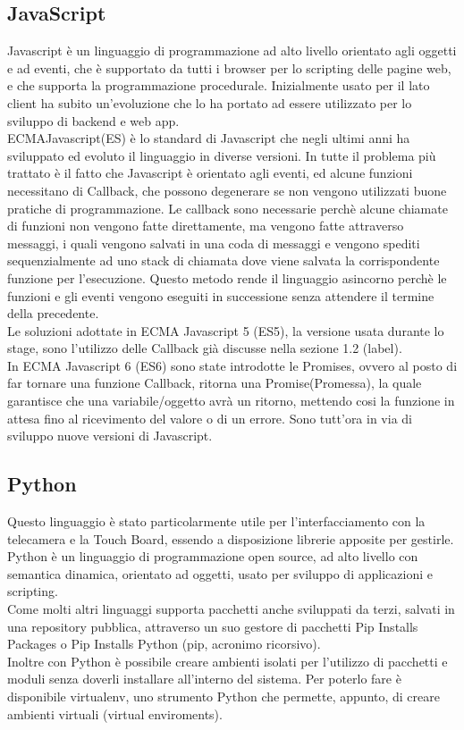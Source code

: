 \subsection{JavaScript}
Javascript \`e un linguaggio di programmazione ad alto livello orientato agli oggetti e ad eventi, che \`e supportato da tutti i browser
per lo scripting delle pagine web, e che supporta la programmazione procedurale.
Inizialmente usato per il lato client ha subito un'evoluzione che lo ha portato ad essere utilizzato per lo sviluppo di backend e web app.
\\[2\baselineskip]
ECMAJavascript(ES) \`e lo standard di Javascript che negli ultimi anni ha sviluppato ed evoluto il linguaggio in diverse versioni.
In tutte il problema pi\`u trattato \`e il fatto che Javascript \`e orientato agli eventi,
ed alcune funzioni necessitano di Callback, che possono degenerare se non vengono
utilizzati buone pratiche di programmazione. Le callback sono necessarie perch\`e alcune chiamate di funzioni non vengono fatte direttamente, ma vengono
fatte attraverso messaggi, i quali vengono salvati in una coda di messaggi e vengono spediti sequenzialmente ad uno stack di chiamata dove
viene salvata la corrispondente funzione per l'esecuzione. Questo metodo rende il linguaggio asincorno perch\`e le funzioni e gli eventi
vengono eseguiti in successione senza attendere il termine della precedente.
\\[1\baselineskip]Le soluzioni adottate in ECMA Javascript 5 (ES5), la versione usata durante lo
stage, sono l'utilizzo delle Callback già discusse nella sezione 1.2 (label).
\\[1\baselineskip]
In ECMA Javascript 6 (ES6) sono state introdotte le Promises, ovvero al posto di far tornare una funzione Callback, ritorna una Promise(Promessa),
la quale garantisce che una variabile/oggetto avr\`a un ritorno, mettendo cosi la funzione in attesa fino al ricevimento del valore o di un errore.
Sono tutt'ora in via di sviluppo nuove versioni di Javascript.

\subsection{Python}\label{cap:python}
Questo linguaggio \`e stato particolarmente utile per l'interfacciamento con la telecamera e la Touch Board, essendo a disposizione librerie
apposite per gestirle.
Python \`e un linguaggio di programmazione open source, ad alto livello con semantica dinamica, orientato ad oggetti, usato
per sviluppo di applicazioni e scripting.\\[1\baselineskip]
Come molti altri linguaggi supporta pacchetti anche sviluppati da terzi, salvati in una repository pubblica,
attraverso un suo gestore di pacchetti Pip Installs Packages o Pip Installs Python (pip, acronimo ricorsivo).
\\[1\baselineskip]
Inoltre con Python \`e possibile creare ambienti isolati per l'utilizzo di pacchetti e moduli senza doverli installare all'interno del sistema.
Per poterlo fare \`e disponibile virtualenv, uno strumento Python che permette, appunto, di creare ambienti virtuali (virtual enviroments).
\\[2\baselineskip]

